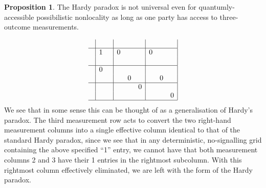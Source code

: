 \documentclass[reprint]{revtex4-1}
\theoremstyle{definition}
\newtheorem{prop}{Proposition}
\begin{document}
\begin{prop}The Hardy paradox is not universal even for quantumly-accessible possibilistic nonlocality as long as one party has access to three-outcome measurements. 
\end{prop}
\begin{equation*}
\begin{array}{ c | c c | c c c| c c c|}
&&&&&&&& \\ \hline
&1&&0&&&0&&\\
   &&&&&&&&\\ \hline
   &0&&&&&&&\\ 
  &&&&0&&&0&\\ \hline
  &&&&&0&&&\\ 
  &&&&&&&&0\\ \hline
\end{array}
\end{equation*}
We see that in some sense this can be thought of as a generalisation of Hardy's paradox. The third measurement row acts to convert the two right-hand measurement columns into a single effective column identical to that of the standard Hardy paradox, since we see that in any deterministic, no-signalling grid containing the above specified ``1'' entry, we cannot have that both measurement columns 2 and 3 have their 1 entries in the rightmost subcolumn. With this rightmost column effectively eliminated, we are left with the form of the Hardy paradox. %

\end{document}
